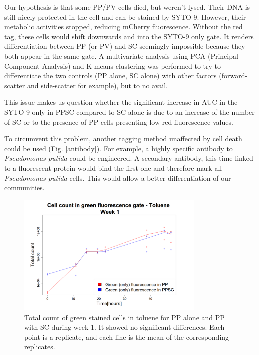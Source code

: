 \documentclass[a4paper, 10pt, conference]{ieeeconf}   %
\begin{document}
Our hypothesis is that some PP/PV cells died, but weren’t lysed. Their DNA is still nicely protected  in the cell and can be stained by SYTO-9. However, their metabolic activities stopped, reducing mCherry fluorescence. Without the red tag, these cells would shift downwards and into the SYTO-9 only gate. It renders differentiation between PP (or PV) and SC seemingly impossible because they both appear in the same gate. A multivariate analysis using PCA (Principal Component Analysis) and K-means clustering was performed to try to differentiate the two controls (PP alone, SC alone) with other factors (forward-scatter and side-scatter for example), but to no avail.

This issue makes us question whether the significant increase in AUC in the SYTO-9 only in PPSC compared to SC alone is due to an increase of the number of SC or to the presence of PP cells presenting low red fluorescence values. 

To circumvent this problem, another tagging method unaffected by cell death could be used (Fig. \ref{antibody}). For example, a highly specific antibody to \textit{Pseudomonas putida} could be engineered. A secondary antibody, this time linked to a fluorescent protein would bind the first one and therefore mark all \textit{Pseudomonas putida} cells. This would allow a better differentiation of our communities.



\begin{figure}
		\centering
		\includegraphics[width=9cm]{problemw1.PNG}
		\caption{Total count of green stained cells in toluene for PP alone and PP with SC during week 1. It showed no significant differences. Each point is a replicate, and each line is the mean of the corresponding replicates.}
		\label{problemw1}
\end{figure}
\end{document}
